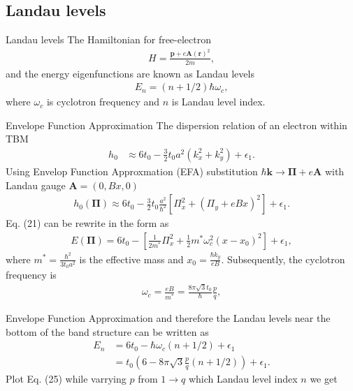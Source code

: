 \documentclass[aspectratio=169,compress,x11names]{beamer}
\begin{document}
	\subsection{Landau levels}
	\begin{frame}{Landau levels}
		The Hamiltonian for free-electron
		\begin{gather}
			H = \frac{\mathbf{p} + e \mathbf{A}(\mathbf{r})^{2}}{2m} ,
		\end{gather}
		and the energy eigenfunctions are known as Landau levels
		\begin{gather}
			E_{n} = \left(n + 1/2\right) \hbar \omega_{c},
		\end{gather}
		where $\omega_{c}$ is cyclotron frequency and $n$ is Landau level index.
	\end{frame}
	\begin{frame}{Envelope Function Approximation}
		The dispersion relation of an electron within TBM
		\begin{equation}
			\begin{aligned}
				h_{0} 
				& \approx 6 t_{0} - \frac{3}{2} t_{0} a^{2} (k_{x}^{2} + k_{y}^{2}) + \epsilon_{1}.
			\end{aligned}
		\end{equation}
		Using Envelop Function Approxmation (EFA) substitution $\hbar\mathbf{k} \to \mathbf{\Pi} + e \mathbf{A}$ with Landau gauge $\mathbf{A} = (0,Bx,0)$
		\begin{gather}
			h_{0}(\mathbf{\Pi})
			\approx 6 t_{0} - \frac{3}{2} t_{0} \frac{a^{2}}{\hbar^{2}} \left[ \Pi_{x}^{2} + \left(\Pi_{y} + e B x\right)^{2}\right] + \epsilon_{1}.
		\end{gather}
		Eq. (21) can be rewrite in the form as 
		\begin{gather}
			E(\mathbf{\Pi}) = 6 t_{0} - \left[\frac{1}{2m^{*}} \Pi_{x}^{2} + \frac{1}{2} m^{*} \omega_{c}^{2}(x - x_{0})^{2}\right] + \epsilon_{1},
		\end{gather}
		where $m^{*} = \frac{\hbar^{2}}{3t_{0}a^{2}}$ is the effective mass and $x_{0} = \frac{\hbar k_{y}}{eB}$. Subsequently, the cyclotron frequency is
		\begin{gather}
			\omega_{c} = \frac{eB}{m^{*}} = \frac{8 \pi \sqrt{3} t_{0}}{\hbar}  \frac{p}{q},
		\end{gather}
	\end{frame}
	\begin{frame}{Envelope Function Approximation}
		and therefore the Landau levels near the bottom of the band structure can be written as
		\begin{equation}
			\begin{aligned}
				E_{n}
				& = 6 t_{0} - \hbar \omega_{c} (n + 1 /2) + \epsilon_{1}                    \\
				& = t_{0} \left(6 - 8\pi\sqrt{3} \frac{p}{q}( n + 1 /2)\right) + \epsilon_{1}.
			\end{aligned}
		\end{equation}
		Plot Eq. (25) while varrying $p$ from $1\to q$ which Landau level index $n$ we get
	\end{frame}
\end{document}

